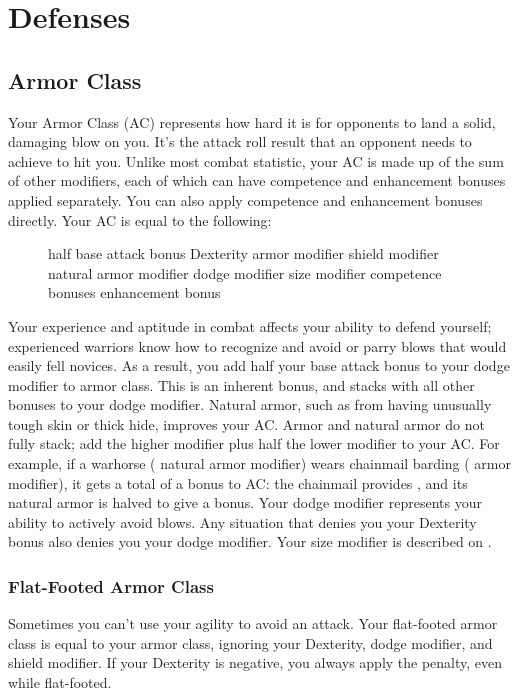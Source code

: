\section{Defenses}

\subsection{Armor Class}
Your Armor Class (AC) represents how hard it is for opponents to land a solid, damaging blow on you. It's the attack roll result that an opponent needs to achieve to hit you. Unlike most combat statistic, your AC is made up of the sum of other modifiers, each of which can have competence and enhancement bonuses applied separately. You can also apply competence and enhancement bonuses directly. Your AC is equal to the following:

\begin{figure}[h]
     \add half base attack bonus \add Dexterity \add armor modifier \add shield modifier \add natural armor modifier \add dodge modifier \add size modifier \add competence bonuses \add enhancement bonus
\end{figure}

 Your experience and aptitude in combat affects your ability to defend yourself; experienced warriors know how to recognize and avoid or parry blows that would easily fell novices. As a result, you add half your base attack bonus to your dodge modifier to armor class. This is an inherent bonus, and stacks with all other bonuses to your dodge modifier.
 Natural armor, such as from having unusually tough skin or thick hide, improves your AC. Armor and natural armor do not fully stack; add the higher modifier plus half the lower modifier to your AC. For example, if a warhorse ( natural armor modifier) wears chainmail barding ( armor modifier), it gets a total of a  bonus to AC: the chainmail provides , and its natural armor is halved to give a  bonus.
 Your dodge modifier represents your ability to actively avoid blows. Any situation that denies you your Dexterity bonus also denies you your dodge modifier.
 Your size modifier is described on .

\subsubsection{Flat-Footed Armor Class}
Sometimes you can't use your agility to avoid an attack. Your flat-footed armor class is equal to your armor class, ignoring your Dexterity, dodge modifier, and shield modifier. If your Dexterity is negative, you always apply the penalty, even while flat-footed.

